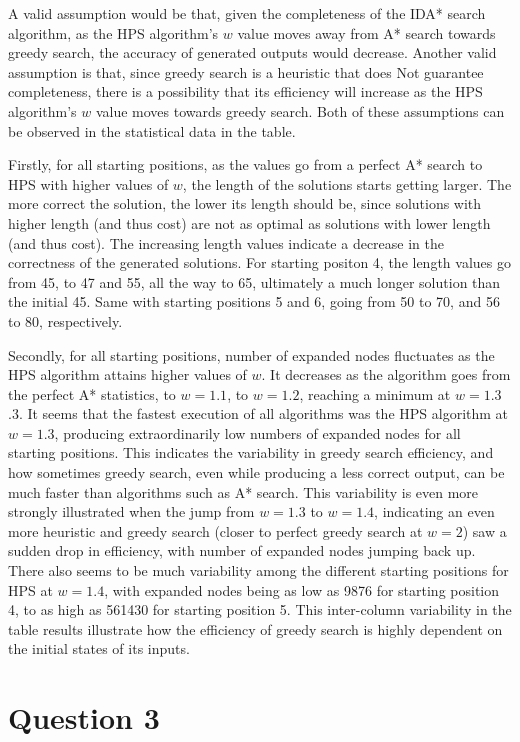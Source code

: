 \documentclass{article}
\begin{document}
A valid assumption would be that, given the completeness of the IDA* search algorithm, as the HPS algorithm’s $w$ value moves away from A* search towards greedy search, the accuracy of generated outputs would decrease. Another valid assumption is that, since greedy search is a heuristic that does Not guarantee completeness, there is a possibility that its efficiency will increase as the HPS algorithm’s $w$ value moves towards greedy search. Both of these assumptions can be observed in the statistical data in the table.

Firstly, for all starting positions, as the values go from a perfect A* search to HPS with higher values of $w$, the length of the solutions starts getting larger. The more correct the solution, the lower its length should be, since solutions with higher length (and thus cost) are not as optimal as solutions with lower length (and thus cost). The increasing length values indicate a decrease in the correctness of the generated solutions. For starting positon 4, the length values go from 45, to 47 and 55, all the way to 65, ultimately a much longer solution than the initial 45. Same with starting positions 5 and 6, going from 50 to 70, and 56 to 80, respectively.

Secondly, for all starting positions, number of expanded nodes fluctuates as the HPS algorithm attains higher values of $w$. It decreases as the algorithm goes from the perfect A* statistics, to $w = 1.1$, to $w = 1.2$, reaching a minimum at $w = 1.3$.3. It seems that the fastest execution of all algorithms was the HPS algorithm at $w = 1.3$, producing extraordinarily low numbers of expanded nodes for all starting positions. This indicates the variability in greedy search efficiency, and how sometimes greedy search, even while producing a less correct output, can be much faster than algorithms such as A* search. This variability is even more strongly illustrated when the jump from $w = 1.3$ to $w = 1.4$, indicating an even more heuristic and greedy search (closer to perfect greedy search at $w = 2$) saw a sudden drop in efficiency, with number of expanded nodes jumping back up. There also seems to be much variability among the different starting positions for HPS at $w = 1.4$, with expanded nodes being as low as 9876 for starting position 4, to as high as 561430 for starting position 5. This inter-column variability in the table results illustrate how the efficiency of greedy search is highly dependent on the initial states of its inputs.

\section*{Question 3}
\end{document}
